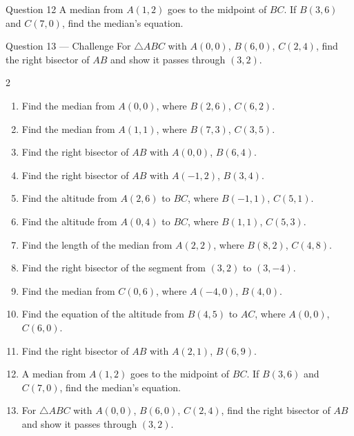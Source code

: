 \documentclass[11pt]{article}
\begin{document}
\begin{qbox}{Question 12}
A median from $A(1,2)$ goes to the midpoint of $BC$. If $B(3,6)$ and $C(7,0)$, find the median's equation.\workspace{2.6cm}
\end{qbox}

\begin{qbox}{Question 13 --- Challenge}
For $\triangle ABC$ with $A(0,0)$, $B(6,0)$, $C(2,4)$, find the right bisector of $AB$ and show it passes through $(3,2)$.\workspace{3.0cm}
\end{qbox}

\clearpage
{}

\begin{recapbox}
\begin{multicols}{2}
\small
\begin{enumerate}[leftmargin=*,itemsep=3pt]
  \item Find the median from $A(0,0)$, where $B(2,6)$, $C(6,2)$.
  \item Find the median from $A(1,1)$, where $B(7,3)$, $C(3,5)$.
  \item Find the right bisector of $AB$ with $A(0,0)$, $B(6,4)$.
  \item Find the right bisector of $AB$ with $A(-1,2)$, $B(3,4)$.
  \item Find the altitude from $A(2,6)$ to $BC$, where $B(-1,1)$, $C(5,1)$.
  \item Find the altitude from $A(0,4)$ to $BC$, where $B(1,1)$, $C(5,3)$.
  \item Find the length of the median from $A(2,2)$, where $B(8,2)$, $C(4,8)$.
  \item Find the right bisector of the segment from $(3,2)$ to $(3,-4)$.
  \item Find the median from $C(0,6)$, where $A(-4,0)$, $B(4,0)$.
  \item Find the equation of the altitude from $B(4,5)$ to $AC$, where $A(0,0)$, $C(6,0)$.
  \item Find the right bisector of $AB$ with $A(2,1)$, $B(6,9)$.
  \item A median from $A(1,2)$ goes to the midpoint of $BC$. If $B(3,6)$ and $C(7,0)$, find the median's equation.
  \item For $\triangle ABC$ with $A(0,0)$, $B(6,0)$, $C(2,4)$, find the right bisector of $AB$ and show it passes through $(3,2)$.
\end{enumerate}
\end{multicols}
\end{recapbox}
\end{document}
